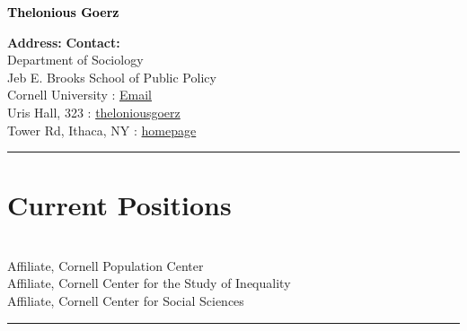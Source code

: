 \documentclass[11pt]{article} %
\begin{document}
\begin{center}
{\Huge\bfseries \textcolor{black}{Thelonious Goerz}} \\
\end{center}

\bigskip 

\textbf{Address:} \hfill \textbf{Contact:} \\
Department of Sociology \\
Jeb E. Brooks School of Public Policy \\ 
Cornell University \hfill {} : \href{mailto:theloniouslgoerz@gmail.com}{Email}\\ %
Uris Hall, 323  \hfill {} : \href{https://github.com/theloniousgoerz/}{theloniousgoerz}\\ %
Tower Rd, Ithaca, NY \hfill {} : \href{theloniousgoerz.github.io}{homepage} \\
\noindent\rule{16cm}{0.4pt}

\vspace{0.001\textheight} %




\section*{Current Positions}

  \\
\hspace*{10mm} Affiliate, Cornell Population Center \\
\hspace*{10mm} Affiliate, Cornell Center for the Study of Inequality \\
\hspace*{10mm} Affiliate, Cornell Center for Social Sciences \\
\noindent\rule{16cm}{0.4pt}
\end{document}
